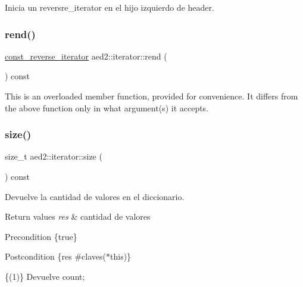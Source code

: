 Inicia un reversre\+\_\+iterator en el hijo izquierdo de header. \mbox{\label{classaed2_1_1iterator_ad7d43d936bf4f3957f590723e9029132}} 
\subsubsection{\texorpdfstring{rend()}{rend()}\hspace{0.1cm}{\footnotesize\ttfamily [2/2]}}
{\footnotesize\ttfamily \hyperlink{classaed2_1_1iterator_a657402896e5b5966660032f5686cc4c4}{const\+\_\+reverse\+\_\+iterator} aed2\+::iterator\+::rend (\begin{DoxyParamCaption}{ }\end{DoxyParamCaption}) const\hspace{0.3cm}{\ttfamily [inline]}}

This is an overloaded member function, provided for convenience. It differs from the above function only in what argument(s) it accepts. \mbox{\label{classaed2_1_1iterator_aa07bd4de2aeca4a6936fdbe9013be2ee}} 
\subsubsection{\texorpdfstring{size()}{size()}}
{\footnotesize\ttfamily size\+\_\+t aed2\+::iterator\+::size (\begin{DoxyParamCaption}{ }\end{DoxyParamCaption}) const\hspace{0.3cm}{\ttfamily [inline]}}



Devuelve la cantidad de valores en el diccionario. 


\begin{DoxyRetVals}{Return values}
{\em res} & cantidad de valores\\
\hline
\end{DoxyRetVals}
\begin{DoxyPrecond}{Precondition}
\{true\} 
\end{DoxyPrecond}
\begin{DoxyPostcond}{Postcondition}
\{res  \#claves($\ast$this)\}
\end{DoxyPostcond}
\{(1)\} Devuelve count; \mbox{\label{classaed2_1_1iterator_a8ec2215b2dfaf6ddd57b1e0b00d8d3d2}} 
